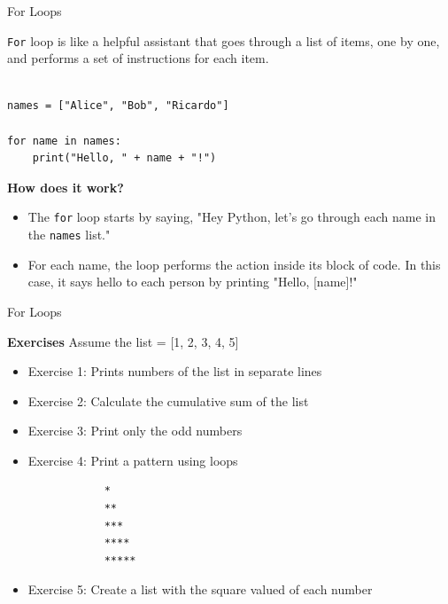 \documentclass[
	11pt, 
]{beamer}
\begin{document}

\begin{frame}[fragile]{For Loops}

\texttt{For} loop is like a helpful assistant that goes through a list of items, one by one, and performs a set of instructions for each item.

\begin{verbatim}

names = ["Alice", "Bob", "Ricardo"]

for name in names:
    print("Hello, " + name + "!")

\end{verbatim}

\begin{exampleblock}{\textbf{How does it work?}}
    \begin{itemize}
        \item The \texttt{for} loop starts by saying, "Hey Python, let's go through each name in the \texttt{names} list."
        \item For each name, the loop performs the action inside its block of code. In this case, it says hello to each person by printing "Hello, [name]!"
    \end{itemize}
\end{exampleblock}

\end{frame}


\begin{frame}[fragile]{For Loops}

\begin{alertblock}{\textbf{Exercises}}
Assume the list = [1, 2, 3, 4, 5]
\begin{itemize}
    \item Exercise 1: Prints numbers of the list in separate lines
    \item Exercise 2: Calculate the cumulative sum of the list
    \item Exercise 3: Print only the odd numbers
    \item Exercise 4: Print a pattern using loops
        \begin{verbatim}
            *
            **
            ***
            ****
            *****
        \end{verbatim}
    \item Exercise 5: Create a list with the square valued of each number
\end{itemize}    
\end{alertblock}

\end{frame}
\end{document}
